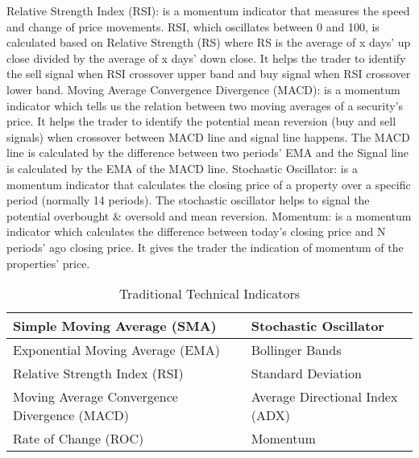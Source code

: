 \documentclass{article}
\begin{document}
\newline
Relative Strength Index (RSI): is a momentum indicator that measures the speed and change of price movements. RSI, which oscillates between 0 and 100, is calculated based on Relative Strength (RS) where RS is the average of x days’ up close divided by the average of x days’ down close. It helps the trader to identify the sell signal when RSI crossover upper band and buy signal when RSI crossover lower band.
\newline
\newline
Moving Average Convergence Divergence (MACD): is a momentum indicator which tells us the relation between two moving averages of a security's price. It helps the trader to identify the potential mean reversion (buy and sell signals) when crossover between MACD line and signal line happens. The MACD line is calculated by the difference between two periods’ EMA and the Signal line is calculated by the EMA of the MACD line.
\newline
\newline
Stochastic Oscillator: is a momentum indicator that calculates the closing price of a property over a specific period (normally 14 periods). The stochastic oscillator helps to signal the potential overbought \& oversold and mean reversion. 
\newline
\newline
Momentum: is a momentum indicator which calculates the difference between today’s closing price and N periods’ ago closing price. It gives the trader the indication of momentum of the properties’ price.

\begin{table}[h!]
\centering
\small %
\setlength{\tabcolsep}{6pt} %
\begin{tabular}{|p{6cm}|p{6cm}|}
\hline
Simple Moving Average (SMA) & Stochastic Oscillator \\
\hline
Exponential Moving Average (EMA) & Bollinger Bands \\
\hline
Relative Strength Index (RSI) & Standard Deviation \\
\hline
Moving Average Convergence Divergence (MACD) & Average Directional Index (ADX) \\
\hline
Rate of Change (ROC) & Momentum \\
\hline
\end{tabular}
\caption{Traditional Technical Indicators}
\label{table:Indicators}
\end{table}
\end{document}
